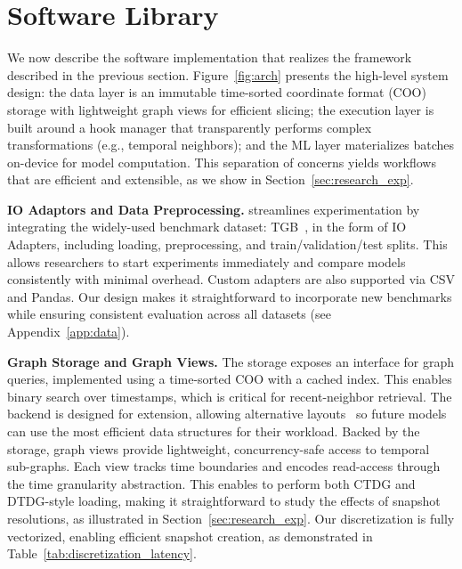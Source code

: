 \section{\name Software Library} \label{sec:software}


We now describe the software implementation that realizes the framework described in the previous section. Figure~\ref{fig:arch} presents the high-level system design: the data layer is an immutable time-sorted coordinate format (COO) storage with lightweight graph views for efficient slicing; the execution layer is built around a hook manager that transparently performs complex transformations (e.g., temporal neighbors); and the ML layer materializes batches on-device for model computation. This separation of concerns yields workflows that are efficient and extensible, as we show in Section~\ref{sec:research_exp}.


\textbf{IO Adaptors and Data Preprocessing.} \name streamlines experimentation by integrating the widely-used benchmark dataset: TGB~\citep{huang2023temporal,tgb2}, in the form of IO Adapters, including loading, preprocessing, and train/validation/test splits. This allows researchers to start experiments immediately and compare models consistently with minimal overhead. Custom adapters are also supported via CSV and Pandas. Our design makes it straightforward to incorporate new benchmarks while ensuring consistent evaluation across all datasets (see Appendix~\ref{app:data}).

\textbf{Graph Storage and Graph Views.} The storage exposes an interface for graph queries, implemented using a time-sorted COO with a cached index. This enables binary search over timestamps, which is critical for recent-neighbor retrieval. The backend is designed for extension, allowing alternative layouts~\citep{lpma, gpma} so future models can use the most efficient data structures for their workload. Backed by the storage, graph views provide lightweight, concurrency-safe access to temporal sub-graphs. Each view tracks time boundaries and encodes read-access through the time granularity abstraction. This enables \name to perform both CTDG and DTDG-style loading, making it straightforward to study the effects of snapshot resolutions, as illustrated in Section~\ref{sec:research_exp}. Our discretization is fully vectorized, enabling efficient snapshot creation, as demonstrated in Table~\ref{tab:discretization_latency}.

